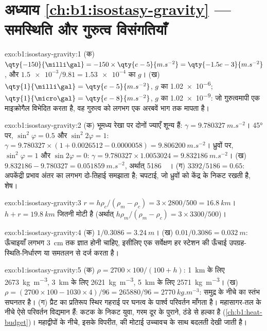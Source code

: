 \section*{अध्याय \ref{ch:b1:isostasy-gravity} --- समस्थिति और गुरुत्व विसंगतियाँ}

\begin{solution}{exo:b1:isostasy-gravity:1}
(क) $\qty{-150}{\milli\gal} = -150\times\qty{e-5}{m.s^{-2}} = \qty{-1.5e-3}{m.s^{-2}}$,
और $\num{1.5e-3}/9.81 = \num{1.53e-4}$ का $g$। (ख) $\qty{1}{\milli\gal} =
\qty{e-5}{m.s^{-2}}$, $g$ का \num{1.02e-6}; $\qty{1}{\micro\gal} =
\qty{e-8}{m.s^{-2}}$, $g$ का \num{1.02e-9}: जो गुरुत्वमापी एक माइक्रोगैल विभेदित करता है, वह गुरुत्व को लगभग एक अरबवें भाग तक मापता है।
\end{solution}

\begin{solution}{exo:b1:isostasy-gravity:2}
(क) भूमध्य रेखा पर दोनों ज्याएँ शून्य हैं: $\gamma = \qty{9.780327}{m.s^{-2}}$। \ang{45} पर, $\sin^2\varphi = 0.5$ और $\sin^2 2\varphi = 1$:
$\gamma = 9.780327\times(1 + 0.0026512 - 0.0000058) = \qty{9.806200}{m.s^{-2}}$।
ध्रुवों पर, $\sin^2\varphi = 1$ और $\sin 2\varphi = 0$:
$\gamma = 9.780327\times1.0053024 = \qty{9.832186}{m.s^{-2}}$।
(ख) $9.832186 - 9.780327 = \qty{0.051859}{m.s^{-2}}$, अर्थात् \qty{5186}{\milli\gal}। (ग) $3392/5186 = 0.65$: अपकेंद्री प्रभाव अंतर का लगभग दो-तिहाई समझाता है; चपटाई, जो ध्रुवों को केंद्र के निकट रखती है, शेष।
\end{solution}

\begin{solution}{exo:b1:isostasy-gravity:3}
$r = h\rho_c/(\rho_m - \rho_c) = 3\times2800/500 = \qty{16.8}{km}$।  $h + r = \qty{19.8}{km}$ जितनी मोटी है (अर्थात् $h\rho_m/(\rho_m - \rho_c) =
3\times3300/500$)।
\end{solution}

\begin{solution}{exo:b1:isostasy-gravity:4}
(क) $1/0.3086 = \qty{3.24}{m}$। (ख) $0.01/0.3086 = \qty{0.032}{m}$: ऊँचाइयाँ लगभग \qty{3}{cm} तक ज्ञात होनी चाहिए, इसीलिए एक सर्वेक्षण हर स्टेशन की ऊँचाई उपग्रह-स्थिति-निर्धारण या समतलन से दर्ज करता है।
\end{solution}

\begin{solution}{exo:b1:isostasy-gravity:5}
(क) $\rho = 2700\times100/(100 + h)$: \qty{1}{km} के लिए \qty{2673}{kg.m^{-3}}, \qty{3}{km} के लिए \qty{2621}{kg.m^{-3}}, \qty{5}{km} के लिए \qty{2571}{kg.m^{-3}}।
(ख) $\rho = (2700\times100 - 1030\times4)/96 = \num{265880}/96 =
\qty{2770}{kg.m^{-3}}$: समुद्र के नीचे का स्तंभ सघनतर है। (ग) प्रैट का प्रतिरूप स्थिर गहराई पर घनत्व के पार्श्व परिवर्तन माँगता है। महासागर-तल के नीचे ऐसे परिवर्तन विद्यमान हैं: कटक के निकट युवा, गरम  दूर के पुराने, ठंडे  से हल्का है (\cref{ch:b1:heat-budget})। महाद्वीपों के नीचे, इसके विपरीत,  की मोटाई उच्चावच के साथ बदलती देखी जाती है।
\end{solution}


